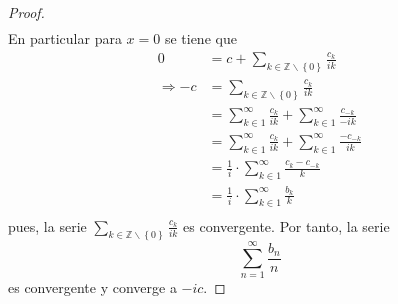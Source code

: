\documentclass[12pt]{report}
\newcounter{it}
\theoremstyle{largebreak}
\begin{document}
\begin{proof}
\begin{equation*}
\begin{split}
            \end{split}
        \end{equation*}
        En particular para $x=0$ se tiene que
        \begin{equation*}
            \begin{split}
                0&=c+\sum_{ k\in\mathbb{Z}\backslash\left\{0\right\}}\frac{c_k}{ik}\\
                \Rightarrow -c&=\sum_{ k\in\mathbb{Z}\backslash\left\{0\right\}}\frac{c_k}{ik}\\
                &=\sum_{k\in1}^\infty\frac{c_k}{ik}+\sum_{k\in1}^\infty\frac{c_{-k}}{-ik}\\
                &=\sum_{k\in1}^\infty\frac{c_k}{ik}+\sum_{k\in1}^\infty\frac{-c_{-k}}{ik}\\
                &=\frac{1}{i}\cdot\sum_{k\in1}^\infty\frac{c_k-c_{ -k}}{k}\\
                &=\frac{1}{i}\cdot\sum_{k\in1}^\infty\frac{b_k}{k}\\
            \end{split}
        \end{equation*}
        pues, la serie $\sum_{ k\in\mathbb{Z}\backslash\left\{0\right\}}\frac{c_k}{ik}$ es convergente. Por tanto, la serie
        \begin{equation*}
            \sum_{ n=1}^\infty\frac{b_n}{n}
        \end{equation*}
        es convergente y converge a $-ic$.


\end{proof}
\end{document}
